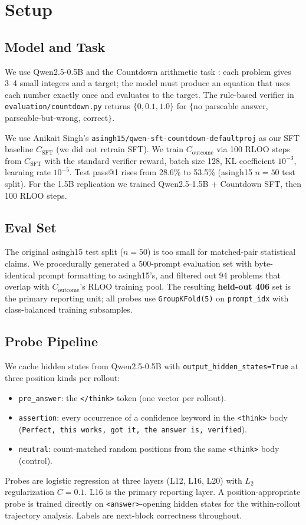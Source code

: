 \documentclass[11pt]{article}
\begin{document}
\section{Setup}

\subsection{Model and Task}
We use Qwen2.5-0.5B and the Countdown arithmetic task \citep{gandhi2024stream}: each problem gives 3--4 small integers and a target; the model must produce an equation that uses each number exactly once and evaluates to the target. The rule-based verifier in \texttt{evaluation/countdown.py} returns $\{0, 0.1, 1.0\}$ for $\{$no parseable answer, parseable-but-wrong, correct$\}$.

We use Anikait Singh's \texttt{asingh15/qwen-sft-countdown-defaultproj} as our SFT baseline $C_{\text{SFT}}$ (we did not retrain SFT). We train $C_{\text{outcome}}$ via 100 RLOO steps from $C_{\text{SFT}}$ with the standard verifier reward, batch size 128, KL coefficient $10^{-3}$, learning rate $10^{-5}$. Test pass@1 rises from 28.6\% to 53.5\% (asingh15 $n{=}50$ test split). For the 1.5B replication we trained Qwen2.5-1.5B + Countdown SFT, then 100 RLOO steps.

\subsection{Eval Set}
The original asingh15 test split ($n{=}50$) is too small for matched-pair statistical claims. We procedurally generated a 500-prompt evaluation set with byte-identical prompt formatting to asingh15's, and filtered out 94 problems that overlap with $C_{\text{outcome}}$'s RLOO training pool. The resulting \textbf{held-out 406} set is the primary reporting unit; all probes use \texttt{GroupKFold(5)} on \texttt{prompt\_idx} with class-balanced training subsamples.

\subsection{Probe Pipeline}
We cache hidden states from Qwen2.5-0.5B with \texttt{output\_hidden\_states=True} at three position kinds per rollout:
\begin{itemize}[leftmargin=2em,itemsep=1pt,topsep=2pt]
  \item \texttt{pre\_answer}: the \texttt{</think>} token (one vector per rollout).
  \item \texttt{assertion}: every occurrence of a confidence keyword in the \texttt{<think>} body (\texttt{Perfect, this works, got it, the answer is, verified}).
  \item \texttt{neutral}: count-matched random positions from the same \texttt{<think>} body (control).
\end{itemize}
Probes are logistic regression at three layers (L12, L16, L20) with $L_2$ regularization $C{=}0.1$. L16 is the primary reporting layer. A position-appropriate probe is trained directly on \texttt{<answer>}-opening hidden states for the within-rollout trajectory analysis. Labels are next-block correctness throughout.
\end{document}
